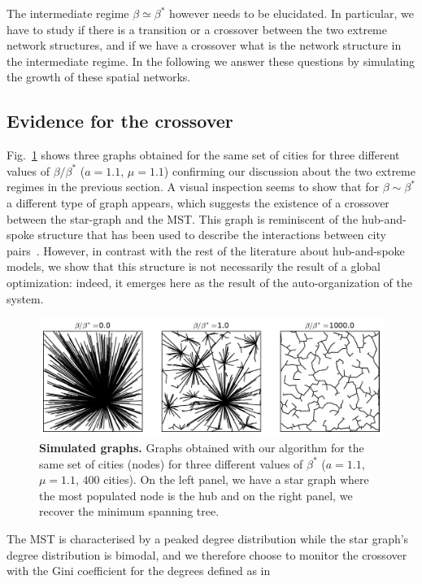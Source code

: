 The intermediate regime $\beta\simeq\beta^*$ however needs to be elucidated.  In
particular, we have to study if there is a transition or a crossover between the
two extreme network structures, and if we have a crossover what is the network
structure in the intermediate regime. In the following we answer these questions
by simulating the growth of these spatial networks.


\subsection{Evidence for the crossover}

Fig.~\ref{fig:plot_graphs} shows three graphs obtained for the same set of
cities for three different values of $\beta/\beta^*$ ($a=1.1$, $\mu=1.1$)
confirming our discussion about the two extreme regimes in the previous section.
A visual inspection seems to show that for $\beta \sim \beta^*$ a different type
of graph appears, which suggests the existence of a crossover between the
star-graph and the MST. This graph is reminiscent of the hub-and-spoke structure
that has been used to describe the interactions between city
pairs~\cite{OKelly:1998,OKelly:1996}. However, in contrast with the rest of the
literature about hub-and-spoke models, we show that this structure is not
necessarily the result of a global optimization: indeed, it emerges here as the
result of the auto-organization of the system.

\begin{figure}
    \centering
    \includegraphics[width=\textwidth]{gfx/chapter-networks/figure1.pdf}
    \caption{{\bf Simulated graphs.} Graphs obtained with our algorithm for the same set of cities
    (nodes) for three different values of $\beta^*$ ($a=1.1$, $\mu=1.1$, $400$
cities). On the left panel, we have a star graph where the most populated node
is the hub and on the right panel, we recover the minimum spanning tree.
\label{fig:plot_graphs}} 
\end{figure}

The MST is characterised by a peaked degree distribution while the star graph's
degree distribution is bimodal, and we therefore choose to monitor the crossover
with the Gini coefficient for the degrees defined as in~\cite{Dixon:1987}

